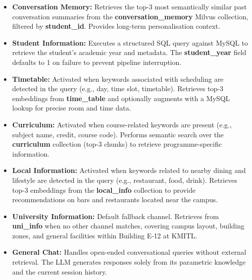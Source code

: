 \begin{itemize}
    \item \textbf{Conversation Memory:} Retrieves the top-3 most semantically similar past conversation summaries from the \textbf{conversation\_memory} Milvus collection, filtered by \textbf{student\_id}. Provides long-term personalisation context.

    \item \textbf{Student Information:} Executes a structured SQL query against MySQL to retrieve the student's academic year and metadata. The \textbf{student\_year} field defaults to 1 on failure to prevent pipeline interruption.

    \item \textbf{Timetable:} Activated when keywords associated with scheduling are detected in the query (e.g., day, time slot, timetable). Retrieves top-3 embeddings from \textbf{time\_table} and optionally augments with a MySQL lookup for precise room and time data.

    \item \textbf{Curriculum:} Activated when course-related keywords are present (e.g., subject name, credit, course code). Performs semantic search over the \textbf{curriculum} collection (top-3 chunks) to retrieve programme-specific information.

    \item \textbf{Local Information:} Activated when keywords related to nearby dining and lifestyle are detected in the query (e.g., restaurant, food, drink). Retrieves top-3 embeddings from the \textbf{local\_info} collection to provide recommendations on bars and restaurants located near the campus.


    \item \textbf{University Information:} Default fallback channel. Retrieves from \textbf{uni\_info} when no other channel matches, covering campus layout, building zones, and general facilities within Building E-12 at KMITL.

    \item \textbf{General Chat:} Handles open-ended conversational queries without external retrieval. The LLM generates responses solely from its parametric knowledge and the current session history.
\end{itemize}

